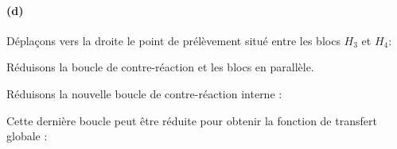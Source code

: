 \paragraph{(d)}
\begin{center}
    
\end{center}
Déplaçons vers la droite le point de prélèvement situé entre les 
blocs $H_3$ et $H_4$:
\begin{center}
    
\end{center}
Réduisons la boucle de contre-réaction et les blocs en parallèle.
\begin{center}
    
\end{center}
Réduisons la nouvelle boucle de contre-réaction interne :
\begin{center}
    
\end{center}
Cette dernière boucle peut être réduite pour obtenir la fonction de 
transfert globale :
\begin{center}
    
\end{center}
\clearpage
